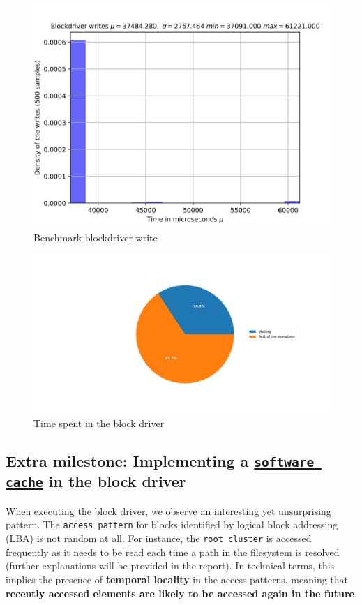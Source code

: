\begin{figure}[htp]
    \centering
    \includegraphics[width=12cm]{images/filesystem/benchmark_writes.jpg}
    \caption{Benchmark blockdriver write}
    \label{fig:galaxy}
\end{figure}

\begin{figure}[htp]
    \centering
    \includegraphics[width=12cm]{images/filesystem/division.png}
    \caption{Time spent in the block driver}
    \label{fig:galaxy}
\end{figure}


\subsection{Extra milestone: Implementing a \href{https://en.wikipedia.org/wiki/Cache_(computing)}{\texttt{software cache}} in the block driver}

When executing the block driver, we observe an interesting yet unsurprising pattern. The \texttt{access pattern} for blocks identified by logical block addressing (LBA) is not random at all. For instance, the \texttt{root cluster} is accessed frequently as it needs to be read each time a path in the filesystem is resolved (further explanations will be provided in the report). In technical terms, this implies the presence of \textbf{temporal locality} in the access patterns, meaning that \textbf{recently accessed elements are likely to be accessed again in the future}.

